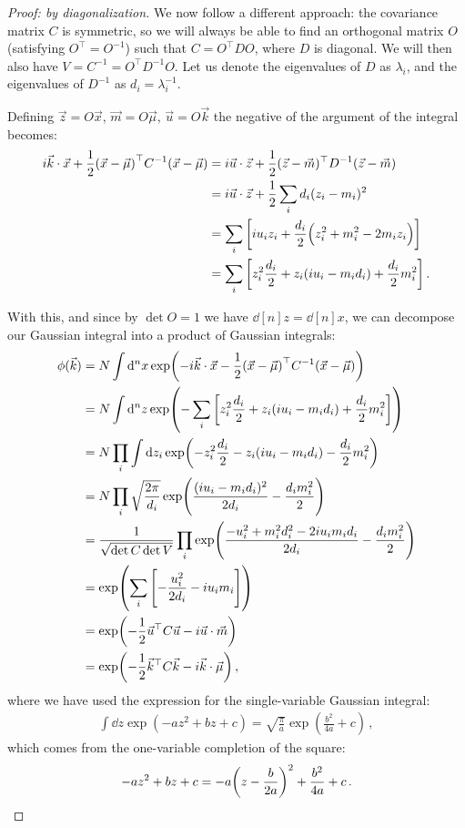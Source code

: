 \documentclass[main.tex]{subfiles}
\begin{document}
\begin{proof}[Proof: by diagonalization]
We now follow a different approach: the covariance matrix \(C\) is symmetric, so we will always be able to find an orthogonal matrix \(O\) (satisfying \(O^{\top} = O^{-1}\)) such that \(C = O^{\top} D O\), where \(D\) is diagonal. 
We will then also have \(V = C^{-1} = O^{\top} D^{-1} O\).
Let us denote the eigenvalues of \(D\) as \(\lambda _i\), and the eigenvalues of \(D^{-1}\) as \(d_i = \lambda _i^{-1}\).

Defining \(\vec{z} = O \vec{x}\), \(\vec{m} = O \vec{\mu}\), \(\vec{u} = O \vec{k}\) the negative of the argument of the integral becomes:
%
\begin{align}
 i \vec{k} \cdot \vec{x} 
 + \frac{1}{2}
\qty(\vec{x} - \vec{\mu})^{\top} C^{-1} 
\qty(\vec{x} - \vec{\mu}) &=
 i \vec{u} \cdot \vec{z} 
+ \frac{1}{2} (\vec{z} - \vec{m})^{\top} D^{-1} (\vec{z} - \vec{m})  \\
&= 
i \vec{u} \cdot \vec{z} 
+ \frac{1}{2} \sum _{i} d_i (z_i - m_i)^2   \\
&= \sum _{i} \qty[i u_i z_i + \frac{d_i}{2} \qty(z_i^2 + m_i^2 - 2 m_i z_i)]  \\
&= \sum _{i} \qty[z_i^2 \frac{d_i}{2} + z_i \qty(i u_i - m_i d_i) + \frac{d_i}{2} m_i^2]
\,.
\end{align}

With this, and since by \(\det O = 1\) we have \(\dd[n]{z} = \dd[n]{x}\), we can decompose our Gaussian integral into a product of Gaussian integrals:
%
\begin{align}
\phi (\vec{k}) &= 
N \int \dd[n]{x} \exp(-  i \vec{k} \cdot \vec{x} 
 - \frac{1}{2}
\qty(\vec{x} - \vec{\mu})^{\top} C^{-1} 
\qty(\vec{x} - \vec{\mu}))  \\
&= N \int \dd[n]{z} \exp(- \sum _{i} \qty[z_i^2 \frac{d_i}{2} + z_i \qty(i u_i - m_i d_i) + \frac{d_i}{2} m_i^2])  \\
&= N \prod_i \int \dd{z_i}
\exp(- z_i^2 \frac{d_i}{2} - z_i \qty(i u_i - m_i d_i) - \frac{d_i}{2} m_i^2)  \\
&= N \prod_i \sqrt{\frac{2\pi }{d_i}} \exp(\frac{(i u_i - m_i d_i)^2}{2 d_i} - \frac{d_im_i^2}{2}) \\
&= \frac{1}{\sqrt{\det C \det V}} \prod_i \exp(\frac{- u_i^2 + m_i^2 d_i^2 - 2 i u_i m_i d_i }{2 d_i} - \frac{d_i m_i^2}{2}) \\
&= \exp(\sum _{i} \qty[- \frac{u_i^2}{2d_i} - i u_i m_i])  \\
&= \exp(- \frac{1}{2} \vec{u}^{\top} C \vec{u} - i \vec{u} \cdot \vec{m})  \\
&= \exp(- \frac{1}{2} \vec{k}^{\top} C \vec{k} - i \vec{k} \cdot \vec{\mu })
\,,
\end{align}
%
where we have used the expression for the single-variable Gaussian integral: 
%
\begin{align} \label{eq:single-variable-gaussian-integral}
\int \dd{z} \exp(- a z^2 + bz + c) = \sqrt{ \frac{\pi}{a}} \exp( \frac{b^2}{4 a} + c)
\,,
\end{align}
%
which comes from the one-variable completion of the square: 
%
\begin{align}
-az^2 + bz + c = -a \qty(z - \frac{b}{2a})^2 + \frac{b^2}{4a} + c
\,.
\end{align}


\end{proof}
\end{document}
